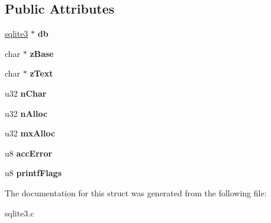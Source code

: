 \subsection*{Public Attributes}
\begin{DoxyCompactItemize}
\item 
\hyperlink{structsqlite3}{sqlite3} $\ast$ {\bfseries db}\hypertarget{structStrAccum_ade44091c9a91671c9457b9e4a98a9a5d}{}\label{structStrAccum_ade44091c9a91671c9457b9e4a98a9a5d}

\item 
char $\ast$ {\bfseries z\+Base}\hypertarget{structStrAccum_a5797e2f288573ee98a4025f0f96fe50d}{}\label{structStrAccum_a5797e2f288573ee98a4025f0f96fe50d}

\item 
char $\ast$ {\bfseries z\+Text}\hypertarget{structStrAccum_ac45a51cb7b85da2ae9865eac21d416dc}{}\label{structStrAccum_ac45a51cb7b85da2ae9865eac21d416dc}

\item 
u32 {\bfseries n\+Char}\hypertarget{structStrAccum_a9ae2f859cd15934c7fd1ed2243782607}{}\label{structStrAccum_a9ae2f859cd15934c7fd1ed2243782607}

\item 
u32 {\bfseries n\+Alloc}\hypertarget{structStrAccum_a48d37540058f35811bd37c5ee56e0c93}{}\label{structStrAccum_a48d37540058f35811bd37c5ee56e0c93}

\item 
u32 {\bfseries mx\+Alloc}\hypertarget{structStrAccum_a113c466027421582120b873ba342529c}{}\label{structStrAccum_a113c466027421582120b873ba342529c}

\item 
u8 {\bfseries acc\+Error}\hypertarget{structStrAccum_a0ff9aa2eca1d5dc78692721e2a56dc1e}{}\label{structStrAccum_a0ff9aa2eca1d5dc78692721e2a56dc1e}

\item 
u8 {\bfseries printf\+Flags}\hypertarget{structStrAccum_a95038abba91f6ec1a74c9dfc4fec0df9}{}\label{structStrAccum_a95038abba91f6ec1a74c9dfc4fec0df9}

\end{DoxyCompactItemize}


The documentation for this struct was generated from the following file\+:\begin{DoxyCompactItemize}
\item 
sqlite3.\+c\end{DoxyCompactItemize}
